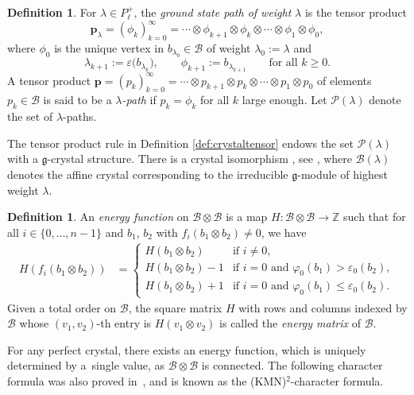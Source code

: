 \documentclass[pdftex]{sigma}
\numberwithin{equation}{section}
\theoremstyle{definition}
\newtheorem{Definition}[Theorem]{Definition}
\begin{document}
\begin{Definition}\label{def:groundstatepath}
For $\lambda \in P^+_\ell$, the \emph{ground state path of weight} $\lambda$ is the tensor product
\[
\mathbf{p}_\lambda = (\phi_k)_{k=0}^{\infty} = \cdots \otimes \phi_{k+1} \otimes \phi_k \otimes \cdots \otimes \phi_1 \otimes \phi_0,
\]
where $\phi_0$ is the unique vertex in $b_{\lambda_0}\in\mathcal{B}$ of weight $\lambda_0:= \lambda$ and
\[
\lambda_{k+1} := \varepsilon\bigl(b_{\lambda_k}\bigr), \qquad \phi_{k+1} := b_{\lambda_{k+1}} \qquad \text{for all } k \geq 0.
\]
A tensor product $\mathbf{p} = (p_k)_{k=0}^{\infty} = \cdots \otimes p_{k+1} \otimes p_k \otimes \cdots \otimes p_1 \otimes p_0$ of elements $p_k \in \mathcal{B}$ is said to be a \emph{$\lambda$-path} if $p_k = \phi_k$ for all $k$ large enough. Let $\mathcal{P}(\lambda)$ denote the set of $\lambda$-paths.
\end{Definition}
The tensor product rule in Definition \ref{def:crystaltensor} endows the set $\mathcal{P}(\lambda)$ with a $\mathfrak{g}$-crystal structure. There is a crystal isomorphism , see \cite[Theorem 10.6.4]{HK02}, where $\mathcal{B}(\lambda)$ denotes the affine crystal corresponding to the irreducible $\mathfrak{g}$-module of highest weight $\lambda$.
\begin{Definition}\label{def:energy}
An \emph{energy function} on $\mathcal{B} \otimes \mathcal{B}$ is a map $H\colon \mathcal{B} \otimes \mathcal{B} \rightarrow \mathbb{Z}$ such that for all $i \in \{0, \dots, n-1\}$ and $b_1$, $b_2$ with $f_i(b_1 \otimes b_2) \neq 0$, we have
\begin{align*}
H\left(f_i(b_1 \otimes b_2)\right) &=
\begin{cases}
H(b_1 \otimes b_2) & \text{if } i \neq 0, \\
H(b_1 \otimes b_2) - 1 & \text{if } i = 0 \text{ and } \varphi_0(b_1) > \varepsilon_0(b_2), \\
H(b_1 \otimes b_2) + 1 & \text{if } i = 0 \text{ and } \varphi_0(b_1) \leq \varepsilon_0(b_2).
\end{cases}
\end{align*}
Given a total order on $\mathcal{B}$, the square matrix $H$ with rows and columns indexed by $\mathcal{B}$ whose \mbox{$(v_1,v_2)$-th} entry is $H(v_1 \otimes v_2)$ is called the \emph{energy matrix} of $\mathcal{B}$.
\end{Definition}

For any perfect crystal, there exists an energy function, which is uniquely determined by a~single value, as $\mathcal{B}\otimes\mathcal{B}$ is connected. The following character formula was also proved in~\cite{KMN92}, and is known as the (KMN)$^2$-character formula.
\end{document}
